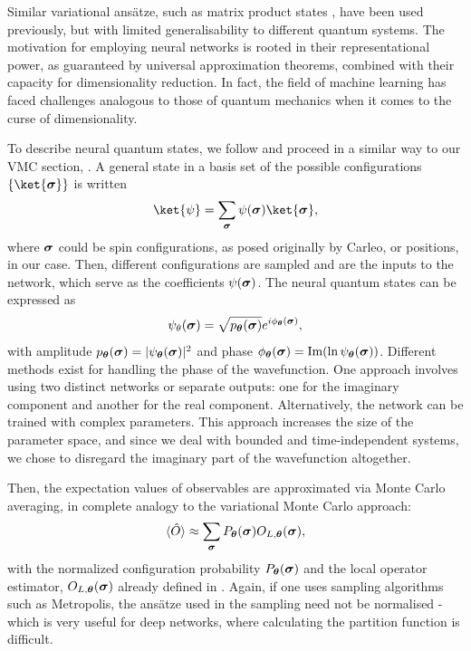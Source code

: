 Similar variational ansätze, such as matrix product states \cite{orus2014practical}, have been used previously, but with limited generalisability to different quantum systems. The motivation for employing neural networks is rooted in their representational power, as guaranteed by universal approximation theorems, combined with their capacity for dimensionality reduction. In fact, the field of machine learning has faced challenges analogous to those of quantum mechanics when it comes to the curse of dimensionality.

To describe neural quantum states, we follow \cite{lange2024architectures} and proceed in a similar way to our VMC section, . A general state in a basis set of the possible configurations $\{\ket{\mvec{\sigma}}\}$ is written
\begin{equation*}
\ket{\psi} = \sum_{\mvec{\sigma}}\psi(\mvec{\sigma}) \ket{\mvec{\sigma}},
\end{equation*}
where $\boldsymbol{\sigma}$ could be spin configurations, as posed originally by Carleo, or positions, in our case. Then, different configurations are sampled and are the inputs to the network, which serve as the coefficients $\psi(\boldsymbol{\sigma})$. The neural quantum states can be expressed as 
\begin{equation*}
    \psi_{\theta}(\boldsymbol{\sigma}) = \sqrt{p_{\boldsymbol{\theta}}(\boldsymbol{\sigma})} e^{i\phi_{\boldsymbol{\theta}}(\boldsymbol{\sigma})},
\end{equation*}
with amplitude $p_{\boldsymbol{\theta}}(\boldsymbol{\sigma}) = |\psi_{\boldsymbol{\theta}}(\boldsymbol{\sigma})|^2$ and phase $\phi_{\boldsymbol{\theta}}(\boldsymbol{\sigma}) = \text{Im}(\ln \psi_{\boldsymbol{\theta}} (\boldsymbol{\sigma}))$. Different methods exist for handling the phase of the wavefunction. One approach involves using two distinct networks or separate outputs: one for the imaginary component and another for the real component. Alternatively, the network can be trained with complex parameters. This approach increases the size of the parameter space, and since we deal with bounded and time-independent systems, we chose to disregard the imaginary part of the wavefunction altogether.

Then, the expectation values of observables are approximated via Monte Carlo averaging, in complete analogy to the variational Monte Carlo approach:
\begin{equation*}
    \langle\hat{O}\rangle \approx  \sum_{\boldsymbol{\sigma}} P_{\boldsymbol{\theta}}(\boldsymbol{\sigma}) O_{L,\boldsymbol{\theta}}(\boldsymbol{\sigma}),
\end{equation*}
with the normalized configuration probability $P_{\boldsymbol{\theta}}(\boldsymbol{\sigma})$ and the local operator estimator, $O_{L,\boldsymbol{\theta}}(\boldsymbol{\sigma})$ already defined in . Again, if one uses sampling algorithms such as Metropolis, the ansätze used in the sampling need not be normalised - which is very useful for deep networks, where calculating the partition function is difficult.

